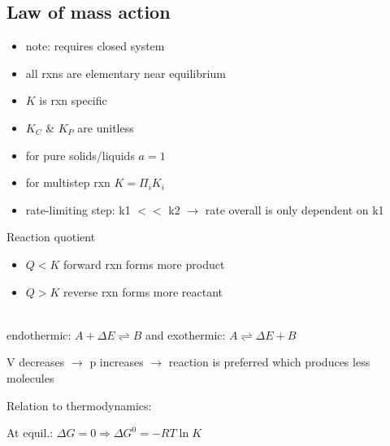 \documentclass[ wastespaceontitle, english]{cheat_sheet_template}
\begin{document}
    \subsection{Law of mass action}
    
       
    \begin{itemize}
        \item note: requires closed system
        \item all rxns are elementary near equilibrium
        \item $K$ is rxn specific
        \item $K_C$ \& $K_P$ are unitless
        \item for pure solids/liquids $a = 1$ 
        \item for multistep rxn $K = \Pi_i K_i$
        \item rate-limiting step: k1 $<<$ k2 $\rightarrow$ rate overall is only dependent on k1 
    \end{itemize}
    Reaction quotient 
    \begin{itemize}
        \item $Q < K$ forward rxn forms more product
        \item $Q > K$ reverse rxn forms more reactant
    \end{itemize}
    \\
    
    endothermic: $A + \Delta E \rightleftharpoons B$ and exothermic: $A \rightleftharpoons \Delta E + B$
    
    V decreases $\rightarrow$ p increases $\rightarrow$ reaction is preferred which produces less molecules
    
    Relation to thermodynamics:
    
    At equil.: $\Delta G = 0 \Rightarrow \Delta G^0 = - R T \ln K$  
 
     
\end{document}
